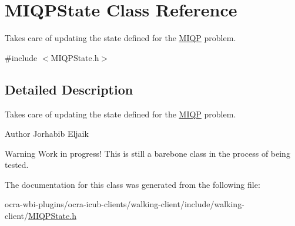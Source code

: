 \hypertarget{classMIQPState}{\section{\-M\-I\-Q\-P\-State \-Class \-Reference}
\label{classMIQPState}
}


\-Takes care of updating the state defined for the \hyperlink{namespaceMIQP}{\-M\-I\-Q\-P} problem.  




{\ttfamily \#include $<$\-M\-I\-Q\-P\-State.\-h$>$}



\subsection{\-Detailed \-Description}
\-Takes care of updating the state defined for the \hyperlink{namespaceMIQP}{\-M\-I\-Q\-P} problem. 

\begin{DoxyAuthor}{\-Author}
\-Jorhabib \-Eljaik \cite{ibanezThesis2015} 
\end{DoxyAuthor}
\begin{DoxyWarning}{\-Warning}
\-Work in progress! \-This is still a barebone class in the process of being tested. 
\end{DoxyWarning}


\-The documentation for this class was generated from the following file\-:\begin{DoxyCompactItemize}
\item 
ocra-\/wbi-\/plugins/ocra-\/icub-\/clients/walking-\/client/include/walking-\/client/\hyperlink{MIQPState_8h}{\-M\-I\-Q\-P\-State.\-h}\end{DoxyCompactItemize}
